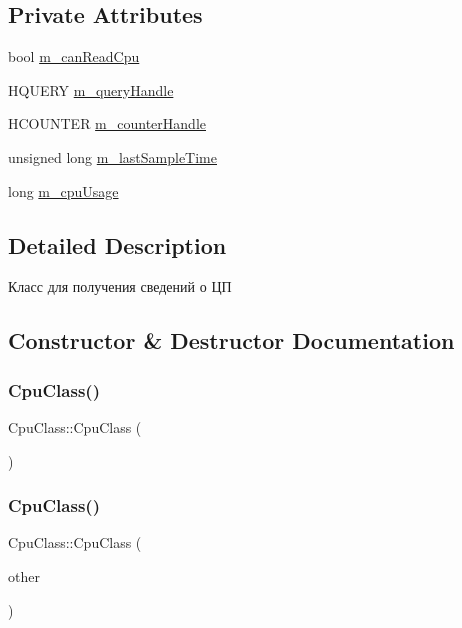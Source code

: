\subsection*{Private Attributes}
\begin{DoxyCompactItemize}
\item 
bool \hyperlink{class_cpu_class_a906430d0b729277cfcbec49519136e18}{m\+\_\+can\+Read\+Cpu}
\item 
H\+Q\+U\+E\+RY \hyperlink{class_cpu_class_af27e1b77d4926a26b7596610a42bffb0}{m\+\_\+query\+Handle}
\item 
H\+C\+O\+U\+N\+T\+ER \hyperlink{class_cpu_class_adb79a53669215a1d022f3bf58e89f6b0}{m\+\_\+counter\+Handle}
\item 
unsigned long \hyperlink{class_cpu_class_a08686a76653283ef672ca4406f472130}{m\+\_\+last\+Sample\+Time}
\item 
long \hyperlink{class_cpu_class_a5f763430418839c98518ce0a5bfbecf0}{m\+\_\+cpu\+Usage}
\end{DoxyCompactItemize}


\subsection{Detailed Description}
Класс для получения сведений о ЦП 

\subsection{Constructor \& Destructor Documentation}
\mbox{\label{class_cpu_class_a19be0f88b8c5f5d5a1762c3fe673502d}} 
\subsubsection{\texorpdfstring{Cpu\+Class()}{CpuClass()}\hspace{0.1cm}{\footnotesize\ttfamily [1/2]}}
{\footnotesize\ttfamily Cpu\+Class\+::\+Cpu\+Class (\begin{DoxyParamCaption}{ }\end{DoxyParamCaption})}

\mbox{\label{class_cpu_class_a16bc5f522eb19dc054761be36a1ffbd2}} 
\subsubsection{\texorpdfstring{Cpu\+Class()}{CpuClass()}\hspace{0.1cm}{\footnotesize\ttfamily [2/2]}}
{\footnotesize\ttfamily Cpu\+Class\+::\+Cpu\+Class (\begin{DoxyParamCaption}\item[{const \hyperlink{class_cpu_class}{Cpu\+Class} \&}]{other }\end{DoxyParamCaption})}

